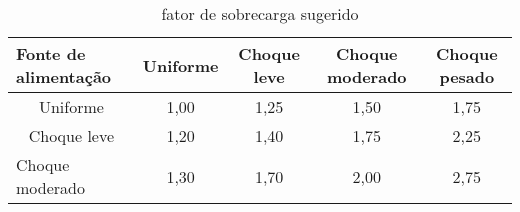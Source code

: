 \begin{table}
\centering
\caption{\label{tab:2} fator de sobrecarga sugerido}
\begin{tabular}{l c c c c}
\hline
\textbf{Fonte de alimentação}     & \textbf{Uniforme}         & \textbf{Choque leve}      & \textbf{Choque moderado}  & \textbf{Choque pesado}    \\ \hline
\multicolumn{1}{c}{Uniforme}    & \multicolumn{1}{c}{1,00} & \multicolumn{1}{c}{1,25} & \multicolumn{1}{c}{1,50} & \multicolumn{1}{c}{1,75} \\ \hline
\multicolumn{1}{c}{Choque leve} & \multicolumn{1}{c}{1,20} & \multicolumn{1}{c}{1,40} & \multicolumn{1}{c}{1,75} & \multicolumn{1}{c}{2,25} \\ \hline
Choque moderado                   & 1,30                      & 1,70                      & 2,00                      & 2,75                      \\ \hline
\end{tabular}
\end{table}